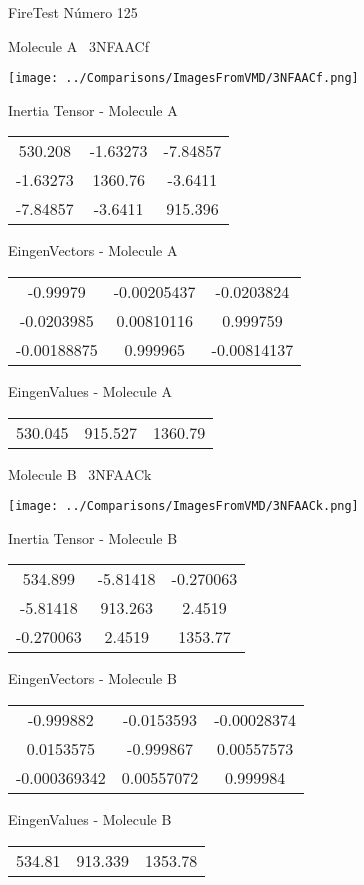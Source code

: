 \vtab[-3cm]
\begin{center}
{\large FireTest \tab Número 125}
\end{center}
\begin{multicols}{2}
\begin{center}

Molecule A \
3NFAACf

\texttt{[image: ../Comparisons/ImagesFromVMD/3NFAACf.png]}

Inertia Tensor - Molecule A \\
\begin{tabular}{|c c c|}
530.208	 & 	-1.63273	 & 	-7.84857	 \\
-1.63273	 & 	1360.76	 & 	-3.6411	 \\
-7.84857	 & 	-3.6411	 & 	915.396
\end{tabular}

\vtab
 EingenVectors - Molecule A     \\
\begin{tabular}{|c c c|}
-0.99979	 & 	-0.00205437	 & 	-0.0203824	 \\
-0.0203985	 & 	0.00810116	 & 	0.999759	 \\
-0.00188875	 & 	0.999965	 & 	-0.00814137
\end{tabular}

\vtab
 EingenValues - Molecule A     \\
\begin{tabular}{|c c c|}
530.045	 & 	915.527	 & 	1360.79	 \\
\end{tabular}
\columnbreak

Molecule B \
3NFAACk

\texttt{[image: ../Comparisons/ImagesFromVMD/3NFAACk.png]}

Inertia Tensor - Molecule B \\
\begin{tabular}{|c c c|}
534.899	 & 	-5.81418	 & 	-0.270063	 \\
-5.81418	 & 	913.263	 & 	2.4519	 \\
-0.270063	 & 	2.4519	 & 	1353.77
\end{tabular}

\vtab
 EingenVectors - Molecule B     \\
\begin{tabular}{|c c c|}
-0.999882	 & 	-0.0153593	 & 	-0.00028374	 \\
0.0153575	 & 	-0.999867	 & 	0.00557573	 \\
-0.000369342	 & 	0.00557072	 & 	0.999984
\end{tabular}

\vtab
 EingenValues - Molecule B     \\
\begin{tabular}{|c c c|}
534.81	 & 	913.339	 & 	1353.78	 \\
\end{tabular}

\end{center}
\end{multicols}

